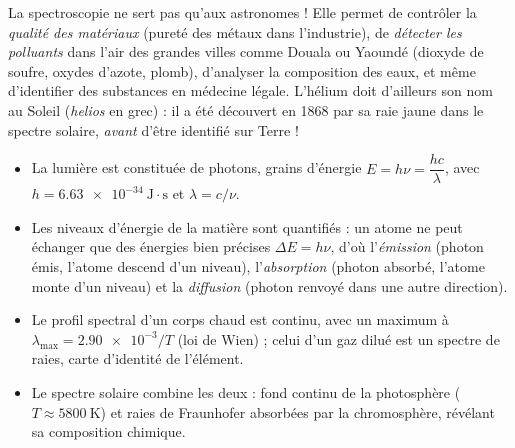 \documentclass[11pt]{article}
\newcommand{\cle}[1]{{\popxbold\color{popdark}#1}}
\newcounter{popsec}
\newcounter{popsub}
\newcommand{\courssub}[1]{%
  \stepcounter{popsub}%
  \par\vspace{9pt}\noindent{\popxbold\fontsize{11.5}{13}\selectfont\color{popink}{\color{poporange}\thepopsec.\thepopsub}\hspace{6pt}#1}\par\nopagebreak\vspace{4pt}
}
\begin{document}
\begin{savaistu}
La spectroscopie ne sert pas qu'aux astronomes ! Elle permet de contrôler la \emph{qualité des matériaux} (pureté des métaux dans l'industrie), de \emph{détecter les polluants} dans l'air des grandes villes comme Douala ou Yaoundé (dioxyde de soufre, oxydes d'azote, plomb), d'analyser la composition des eaux, et même d'identifier des substances en médecine légale. L'hélium doit d'ailleurs son nom au Soleil (\emph{helios} en grec) : il a été découvert en 1868 par sa raie jaune dans le spectre solaire, \emph{avant} d'être identifié sur Terre !
\end{savaistu}

\courssub{Bilan de la leçon}

\begin{aretenir}
\begin{itemize}
\item La lumière est constituée de \cle{photons}, grains d'énergie $E = h\nu = \dfrac{hc}{\lambda}$, avec $h = \num{6,63e-34}\ \mathrm{J \cdot s}$ et $\lambda = c/\nu$.
\item Les niveaux d'énergie de la matière sont \cle{quantifiés} : un atome ne peut échanger que des énergies bien précises $\Delta E = h\nu$, d'où l'\emph{émission} (photon émis, l'atome descend d'un niveau), l'\emph{absorption} (photon absorbé, l'atome monte d'un niveau) et la \emph{diffusion} (photon renvoyé dans une autre direction).
\item Le \cle{profil spectral} d'un corps chaud est continu, avec un maximum à $\lambda_{\max} = \num{2,90e-3}/T$ (loi de Wien) ; celui d'un gaz dilué est un spectre de raies, carte d'identité de l'élément.
\item Le spectre solaire combine les deux : fond continu de la photosphère ($T \approx 5800\ \mathrm{K}$) et raies de Fraunhofer absorbées par la chromosphère, révélant sa composition chimique.
\end{itemize}
\end{aretenir}
\end{document}
